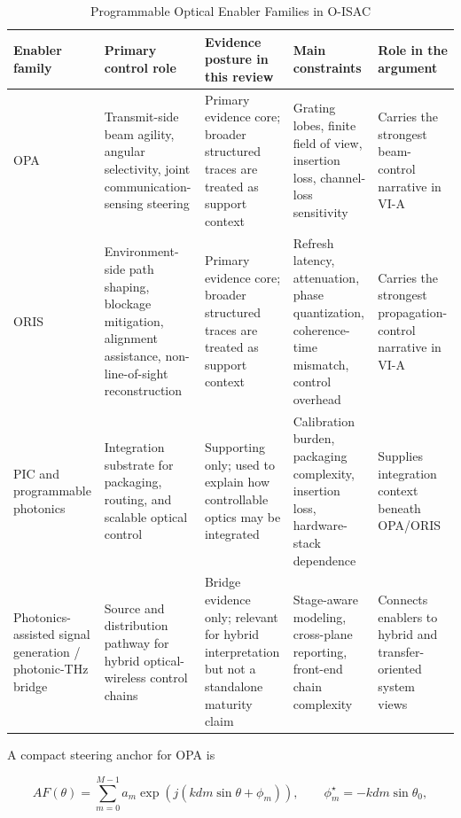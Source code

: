 \begin{table}[!t]
\caption{Programmable Optical Enabler Families in O-ISAC}
\label{tab:enablers-families}
\centering
\scriptsize
\setlength{\tabcolsep}{4pt}
\begin{tabularx}{\textwidth}{>{\raggedright\arraybackslash}p{} >{\raggedright\arraybackslash}p{} >{\raggedright\arraybackslash}p{} >{\raggedright\arraybackslash}p{} >{\raggedright\arraybackslash}X}
\toprule
\textbf{Enabler family} & \textbf{Primary control role} & \textbf{Evidence posture in this review} & \textbf{Main constraints} & \textbf{Role in the argument} \\
\midrule
OPA & Transmit-side beam agility, angular selectivity, joint communication-sensing steering & Primary evidence core; broader structured traces are treated as support context & Grating lobes, finite field of view, insertion loss, channel-loss sensitivity & Carries the strongest beam-control narrative in VI-A \\
ORIS & Environment-side path shaping, blockage mitigation, alignment assistance, non-line-of-sight reconstruction & Primary evidence core; broader structured traces are treated as support context & Refresh latency, attenuation, phase quantization, coherence-time mismatch, control overhead & Carries the strongest propagation-control narrative in VI-A \\
PIC and programmable photonics & Integration substrate for packaging, routing, and scalable optical control & Supporting only; used to explain how controllable optics may be integrated & Calibration burden, packaging complexity, insertion loss, hardware-stack dependence & Supplies integration context beneath OPA/ORIS \\
Photonics-assisted signal generation / photonic-THz bridge & Source and distribution pathway for hybrid optical-wireless control chains & Bridge evidence only; relevant for hybrid interpretation but not a standalone maturity claim & Stage-aware modeling, cross-plane reporting, front-end chain complexity & Connects enablers to hybrid and transfer-oriented system views \\
\bottomrule
\end{tabularx}
\end{table}

A compact steering anchor for OPA is

\begin{equation}
AF(\theta)=\sum_{m=0}^{M-1} a_m \exp\!\left(j\left(kdm\sin\theta+\phi_m\right)\right),
\qquad
\phi_m^{\star}=-kdm\sin\theta_0,
\end{equation}

